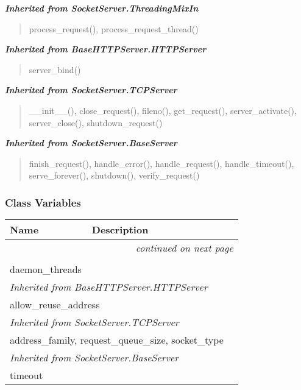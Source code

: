 \large{\textbf{\textit{Inherited from SocketServer.ThreadingMixIn}}}

\begin{quote}
process\_request(), process\_request\_thread()
\end{quote}

\large{\textbf{\textit{Inherited from BaseHTTPServer.HTTPServer}}}

\begin{quote}
server\_bind()
\end{quote}

\large{\textbf{\textit{Inherited from SocketServer.TCPServer}}}

\begin{quote}
\_\_init\_\_(), close\_request(), fileno(), get\_request(), server\_activate(), server\_close(), shutdown\_request()
\end{quote}

\large{\textbf{\textit{Inherited from SocketServer.BaseServer}}}

\begin{quote}
finish\_request(), handle\_error(), handle\_request(), handle\_timeout(), serve\_forever(), shutdown(), verify\_request()
\end{quote}


  \subsubsection{Class Variables}

    \vspace{-1cm}
\hspace{\varindent}\begin{longtable}{|p{\varnamewidth}|p{\vardescrwidth}|l}
\cline{1-2}
\cline{1-2} \centering \textbf{Name} & \centering \textbf{Description}& \\
\cline{1-2}
\endhead\cline{1-2}\multicolumn{3}{r}{\small\textit{continued on next page}}\\\endfoot\cline{1-2}
\endlastfoot\multicolumn{2}{|l|}{\textit{Inherited from SocketServer.ThreadingMixIn}}\\
\multicolumn{2}{|p{\varwidth}|}{\raggedright daemon\_threads}\\
\cline{1-2}
\multicolumn{2}{|l|}{\textit{Inherited from BaseHTTPServer.HTTPServer}}\\
\multicolumn{2}{|p{\varwidth}|}{\raggedright allow\_reuse\_address}\\
\cline{1-2}
\multicolumn{2}{|l|}{\textit{Inherited from SocketServer.TCPServer}}\\
\multicolumn{2}{|p{\varwidth}|}{\raggedright address\_family, request\_queue\_size, socket\_type}\\
\cline{1-2}
\multicolumn{2}{|l|}{\textit{Inherited from SocketServer.BaseServer}}\\
\multicolumn{2}{|p{\varwidth}|}{\raggedright timeout}\\
\cline{1-2}
\end{longtable}

